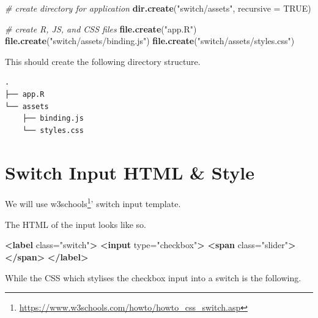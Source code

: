 \documentclass[
]{krantz}
\makeatletter
\newenvironment{Shaded}{\begin{snugshade}}{\end{snugshade}}
\newcommand{\CommentTok}[1]{\textcolor[rgb]{0.37,0.37,0.37}{\textit{#1}}}
\newcommand{\DataTypeTok}[1]{\textcolor[rgb]{0.27,0.27,0.27}{#1}}
\newcommand{\KeywordTok}[1]{\textcolor[rgb]{0.27,0.27,0.27}{\textbf{#1}}}
\newcommand{\NormalTok}[1]{#1}
\newcommand{\OtherTok}[1]{\textcolor[rgb]{0.37,0.37,0.37}{#1}}
\newcommand{\StringTok}[1]{\textcolor[rgb]{0.5,0.5,0.5}{#1}}
\renewcommand{\href}[2]{#2\footnote{\url{#1}}}
\newenvironment{kframe}{%
\medskip{}
\setlength{\fboxsep}{.8em}
 \def\at@end@of@kframe{}%
 \ifinner\ifhmode%
  \def\at@end@of@kframe{\end{minipage}}%
  \begin{minipage}{\columnwidth}%
 \fi\fi%
 \def\FrameCommand##1{\hskip\@totalleftmargin \hskip-\fboxsep
 \colorbox{shadecolor}{##1}\hskip-\fboxsep
     \hskip-\linewidth \hskip-\@totalleftmargin \hskip\columnwidth}%
 \MakeFramed {\advance\hsize-\width
   \@totalleftmargin\z@ \linewidth\hsize
   \@setminipage}}%
 {\par\unskip\endMakeFramed%
 \at@end@of@kframe}
\renewenvironment{Shaded}{\begin{kframe}}{\end{kframe}}
\makeatother
\begin{document}
\begin{Shaded}
\begin{Highlighting}[]
\CommentTok{\# create directory for application}
\KeywordTok{dir.create}\NormalTok{(}\StringTok{"switch/assets"}\NormalTok{, }\DataTypeTok{recursive =} \OtherTok{TRUE}\NormalTok{)}

\CommentTok{\# create R, JS, and CSS files}
\KeywordTok{file.create}\NormalTok{(}\StringTok{"app.R"}\NormalTok{)}
\KeywordTok{file.create}\NormalTok{(}\StringTok{"switch/assets/binding.js"}\NormalTok{)}
\KeywordTok{file.create}\NormalTok{(}\StringTok{"switch/assets/styles.css"}\NormalTok{)}
\end{Highlighting}
\end{Shaded}

This should create the following directory structure.

\begin{verbatim}
.
├── app.R
└── assets
    ├── binding.js
    └── styles.css
\end{verbatim}

\hypertarget{shiny-input-intro}{%
\section{Switch Input HTML \& Style}\label{shiny-input-intro}}

We will use \href{https://www.w3schools.com/howto/howto_css_switch.asp}{w3schools}' switch input template.

The HTML of the input looks like so.

\begin{Shaded}
\begin{Highlighting}[]
\KeywordTok{<label}\OtherTok{ class=}\StringTok{"switch"}\KeywordTok{>}
  \KeywordTok{<input}\OtherTok{ type=}\StringTok{"checkbox"}\KeywordTok{>}
  \KeywordTok{<span}\OtherTok{ class=}\StringTok{"slider"}\KeywordTok{></span>}
\KeywordTok{</label>}
\end{Highlighting}
\end{Shaded}

While the CSS which stylises the checkbox input into a switch is the following.
\end{document}

